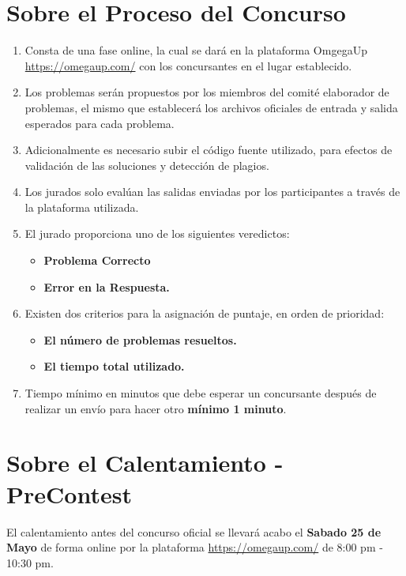\documentclass{article}
\begin{document}
\begin{itemize}
          \section{Sobre el Proceso del Concurso}
          \begin{enumerate}
              \item Consta de una fase online, la cual se dará en la plataforma OmgegaUp \url{https://omegaup.com/} con los concursantes en el lugar establecido.
              \item Los problemas serán propuestos por los miembros del comité elaborador de problemas, el mismo que establecerá los archivos oficiales de entrada y salida esperados para cada problema.
              \item Adicionalmente es necesario subir el código fuente utilizado, para efectos de
                    validación de las soluciones y detección de plagios.
              \item Los jurados solo evalúan las salidas enviadas por los participantes a través
                    de la plataforma utilizada.
              \item El jurado proporciona uno de los siguientes veredictos:
                    \begin{itemize}
                        \item \textbf{Problema Correcto}
                        \item \textbf{Error en la Respuesta.}
                    \end{itemize}
              \item Existen dos criterios para la asignación de puntaje, en orden de prioridad:
                    \begin{itemize}
                        \item \textbf{El número de problemas resueltos.}
                        \item \textbf{El tiempo total utilizado.}
                    \end{itemize}
              \item Tiempo mínimo en minutos que debe esperar un concursante después de realizar un envío para hacer otro \textbf{mínimo 1 minuto}.
          \end{enumerate}
          \section{Sobre el Calentamiento - PreContest}
          El calentamiento antes del concurso oficial se llevará acabo el \textbf{Sabado 25 de Mayo} de forma online por la plataforma \url{https://omegaup.com/} de 8:00 pm - 10:30 pm.

\end{itemize}
\end{document}
